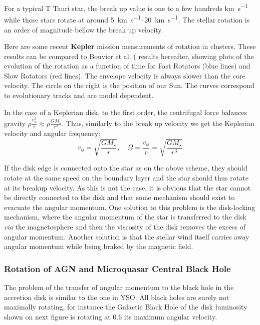 \documentclass[10pt,a4paper,english]{article}
\begin{document}
For a typical T Tauri star, the break up value is one to a few
hundreds \si{\km\per\s} while those stars rotate at around
\SIrange{5}{20}{\km\per\s}. The stellar rotation is an order of
magnitude bellow the break up velocity.

Here are some recent \textbf{Kepler} mission measurements of rotation
in clusters.   These results can be compared to
Bouvier et al. ( results hereafter, showing plots of the evolution of
the rotation as a function of time for Fast Rotators (blue lines) and
Slow Rotators (red lines). The envelope velocity is always slower than
the core velocity. The circle on the right is the position of our
Sun. The curves correspond to evolutionary tracks and are model
dependent.


In the case of a Keplerian disk, to the first order, the centrifugal
force balances gravity
$\rho \frac{v_\phi^2}{r} \approx \rho \frac{GM_\star}{r^2}$. Thus,
similarly to the break up velocity we get the Keplerian velocity and
angular frequency:
\begin{equation}
  v_\phi = \sqrt{\frac{GM_\star}{r}}, \quad \Omega = \frac{v_\phi}{r} = \sqrt{\frac{GM_\star}{r^3}}
\end{equation}

If the disk edge is connected onto the star as on the above scheme,
they should rotate at the same speed on the boundary layer and the
star should thus rotate at its breakup velocity. As this is not the
case, it is obvious that the star cannot be directly connected to the
disk and that some mechanism should exist to evacuate the angular
momentum. One solution to this problem is the disk-locking mechanism,
where the angular momentum of the star is transferred to the disk
\emph{via} the magnetosphere and then the viscosity of the disk
removes the excess of angular momentum. Another solution is that the
stellar wind itself carries away angular momentum while being braked
by the magnetic field.
\subsubsection{Rotation of AGN and Microquasar Central Black Hole}
The problem of the transfer of angular momentum to the black hole in
the accretion disk is similar to the one in YSO. All black holes are
surely not maximally rotating, for instance the Galactic Black Hole of
the disk luminosity shown on next figure is rotating at 0.6 its
maximum angular velocity.
\end{document}
